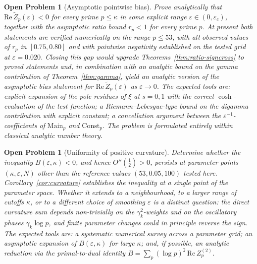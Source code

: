 \documentclass[11pt]{article}
\newtheorem{openproblem}[theorem]{Open Problem}
\newcommand{\Zt}{\widetilde{Z}}
\begin{document}
\begin{openproblem}[Asymptotic pointwise bias]\label{op:bias}
\label{op:bias-asymp}
Prove analytically that $\mathrm{Re}\,\Zt_p(\varepsilon)<0$ for every
prime $p\le\kappa$ in some explicit range $\varepsilon\in(0,\varepsilon_c)$,
together with the asymptotic ratio bound $r_p<1$ for every prime $p$.
At present both statements are verified numerically on the range
$p\le 53$, with all observed values of $r_p$ in $[0.75,0.80]$ and with
pointwise negativity established on the tested grid at
$\varepsilon=0.020$.
Closing this gap would upgrade Theorems~\ref{thm:ratio-signcross}
to proved statements and, in combination with an analytic bound on the
gamma contribution of Theorem~\ref{thm:gamma}, yield an analytic
version of the asymptotic bias statement for
$\mathrm{Re}\,\Zt_p(\varepsilon)$ as $\varepsilon\to 0$.
The expected tools are: explicit expansion of the pole residues of
$\xi$ at $s=0,1$ with the correct $\cosh$-evaluation of the test
function; a Riemann--Lebesgue-type bound on the digamma contribution
with explicit constant; a cancellation argument between the
$\varepsilon^{-1}$-coefficients of $\mathrm{Main}_p$ and
$\mathrm{Const}_p$.
The problem is formulated entirely within classical analytic number theory.
\end{openproblem}

\begin{openproblem}[Uniformity of positive curvature]\label{op:uniform}
\label{op:uniformity}
Determine whether the inequality $B(\varepsilon,\kappa)<0$, and hence
$O''(\tfrac12)>0$, persists at parameter points
$(\kappa,\varepsilon,N)$ other than the reference values
$(53,0.05,100)$ tested here.
Corollary~\ref{cor:curvature} establishes the inequality at a single
point of the parameter space.
Whether it extends to a neighbourhood, to a larger range of cutoffs
$\kappa$, or to a different choice of smoothing $\varepsilon$ is a
distinct question: the direct curvature sum depends non-trivially on
the $\gamma_k^2$-weights and on the oscillatory phases $\gamma_k\log p$,
and finite parameter changes could in principle reverse the sign.
The expected tools are: a systematic numerical survey across a
parameter grid; an asymptotic expansion of $B(\varepsilon,\kappa)$ for
large $\kappa$; and, if possible, an analytic reduction via the
primal-to-dual identity $B=\sum_p(\log p)^2\,\mathrm{Re}\,Z_p^{(2)}$.
\end{openproblem}
\end{document}
